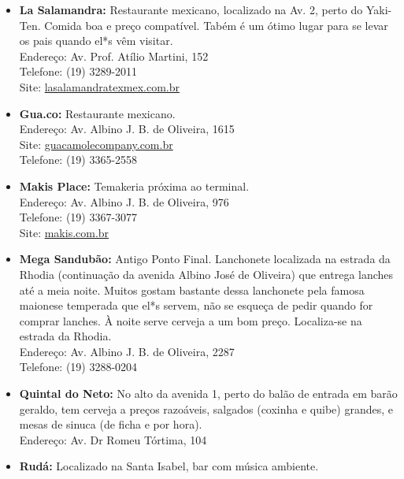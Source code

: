 \begin{itemize}
    \item   \textbf{La Salamandra:} Restaurante mexicano, localizado na Av. 2,
        perto do Yaki-Ten. Comida boa e preço compatível. Tabém é um ótimo lugar
        para se levar os pais quando el*s vêm visitar.
        \\Endereço: Av. Prof. Atílio Martini, 152
        \\Telefone: (19) 3289-2011
        \\Site: \url{lasalamandratexmex.com.br}

    \item    \textbf{Gua.co:} Restaurante mexicano.
        \\Endereço: Av. Albino J. B. de Oliveira, 1615
        \\Site: \url{guacamolecompany.com.br}
        \\Telefone: (19) 3365-2558

    \item   \textbf{Makis Place:} Temakeria próxima ao terminal.
        \\Endereço: Av. Albino J. B. de Oliveira, 976
        \\Telefone: (19) 3367-3077
        \\Site: \url{makis.com.br}

    \item   \textbf{Mega Sandubão:}
      Antigo Ponto Final. Lanchonete localizada na estrada da Rhodia
      (continuação da avenida Albino José de Oliveira) que entrega
      lanches até a meia noite. Muitos gostam bastante dessa
      lanchonete pela famosa maionese temperada que el*s servem, não
      se esqueça de pedir quando for comprar lanches. À noite serve
      cerveja a um bom preço. Localiza-se na estrada da Rhodia.
        \\Endereço: Av. Albino J. B. de Oliveira, 2287
        \\Telefone: (19) 3288-0204

    \item   \textbf{Quintal do Neto:} No alto da avenida 1, perto do balão de
        entrada em barão geraldo, tem cerveja a preços razoáveis, salgados
        (coxinha e quibe) grandes, e mesas de sinuca (de ficha e por hora).
        \\Endereço: Av. Dr Romeu Tórtima, 104

    \item   \textbf{Rudá:} Localizado na Santa Isabel, bar com música ambiente.


\end{itemize}
